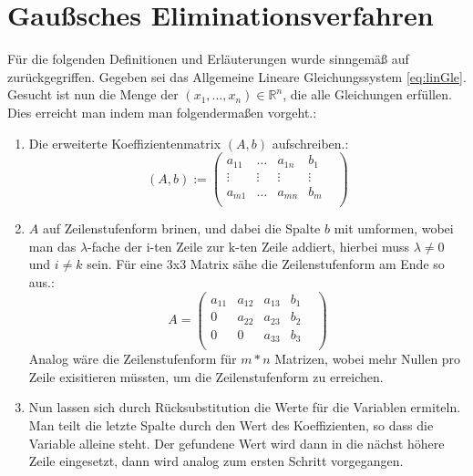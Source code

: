 \documentclass[a4paper, 12pt]{report}
\begin{document}
\begin{sloppypar}
\section{Gaußsches Eliminationsverfahren} \label{2.2}
Für die folgenden Definitionen und Erläuterungen wurde sinngemäß auf \cite{fischer14} zurückgegriffen. \newline
Gegeben sei das Allgemeine Lineare Gleichungssystem \ref{eq:linGle}. Gesucht ist nun die Menge der $ (x_1, \hdots ,x_n ) \in \mathbb{R}^n $, die alle Gleichungen erfüllen.
Dies erreicht man indem man folgendermaßen vorgeht.:
\begin{enumerate}
    \item Die erweiterte Koeffizientenmatrix $ (A, b) $ aufschreiben.:
        \begin{equation}
            (A, b):=
            \begin{pmatrix}
                a_{11} & \hdots &  a_{1n} &  b_1  \\
                \vdots & \vdots &  \vdots & \vdots &  \\
                a_{m1} &  \hdots &  a_{mn} &  b_m \\
            \end{pmatrix}
        \end{equation}
    \item $A$ auf Zeilenstufenform brinen, und dabei die Spalte $b$ mit umformen, wobei man das $ \lambda$-fache der i-ten Zeile zur k-ten Zeile addiert, hierbei muss $ \lambda \neq 0 $ und $ i \neq k$ sein.
        Für eine 3x3 Matrix sähe die Zeilenstufenform am Ende so aus.:
          \begin{equation}
              A =
             \begin{pmatrix}
                 a_{11} & a_{12} &  a_{13} &  b_1  \\
                 0 & a_{22} &  a_{23} & b_2 &  \\
                0 &  0  &  a_{33} &  b_3 \\
            \end{pmatrix}
          \end{equation} \newline
          Analog wäre die Zeilenstufenform für $ m * n $ Matrizen, wobei mehr Nullen pro Zeile exisitieren müssten, um die Zeilenstufenform zu erreichen.
    \item Nun lassen sich durch Rücksubstitution die Werte für die Variablen ermiteln. Man teilt die letzte Spalte durch den Wert des Koeffizienten, so dass die Variable alleine steht.
          Der gefundene Wert wird dann in die nächst höhere Zeile eingesetzt, dann wird analog zum ersten Schritt vorgegangen.
\end{enumerate}




\end{sloppypar}
\end{document}
